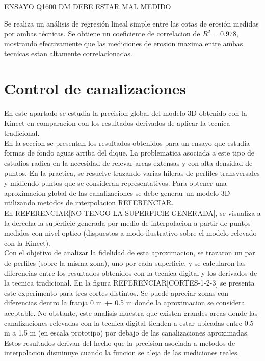 ENSAYO Q1600 DM DEBE ESTAR MAL MEDIDO

Se realiza un análisis de regresión lineal simple entre las cotas de erosión medidas por ambas técnicas. Se obtiene un coeficiente de correlacion de $ R^{2} = 0.978 $, mostrando efectivamente que las mediciones de erosion maxima entre ambas tecnicas estan altamente correlacionadas.

\section{Control de canalizaciones}

En este apartado se estudia la precision global del modelo 3D obtenido con la Kinect en comparacion con los resultados derivados de aplicar la tecnica tradicional. \\
En la seccion \label{sec:ensayo-formas-de-fondo} se presentan los resultados obtenidos para un ensayo que estudia formas de fondo aguas arriba del dique. La problematica asociada a este tipo de estudios radica en la necesidad de relevar areas extensas y con alta densidad de puntos. En la practica, se resuelve trazando varias hileras de perfiles transversales y midiendo puntos que se consideran representativos. Para obtener una aproximacion global de las canalizaciones se debe generar un modelo 3D utilizando metodos de interpolacion REFERENCIAR. \\
En REFERENCIAR[NO TENGO LA SUPERFICIE GENERADA], se visualiza a la derecha la superficie generada por medio de interpolacion a partir de puntos medidos con nivel optico (dispuestos a modo ilustrativo sobre el modelo relevado con la Kinect). \\
Con el objetivo de analizar la fidelidad de esta aproximacion, se trazaron un par de perfiles (sobre la misma zona), uno por cada superficie, y se calcularon las diferencias entre los resultados obtenidos con la tecnica digital y los derivados de la tecnica tradicional. En la figura REFERENCIAR[CORTES-1-2-3] se presenta este experimento para tres cortes distintos. Se puede apreciar zonas con diferencias dentro la franja 0 m +- 0.5 m donde la aproximacion se considera aceptable. No obstante, este analisis muestra que existen grandes areas donde las canalizaciones relevadas con la tecnica digital tienden a estar ubicadas entre 0.5 m a 1.5 m (en escala prototipo) por debajo de las canalizaciones aproximadas. Estos resultados derivan del hecho que la precision asociada a metodos de interpolacion disminuye cuando la funcion se aleja de las mediciones reales. \\
